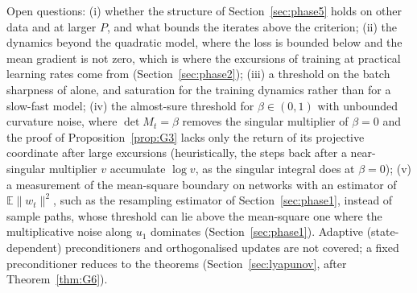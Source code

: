 \documentclass[11pt]{article}
\theoremstyle{remark}
\newcommand{\E}{\mathbb{E}}
\begin{document}
Open questions: (i) whether the structure of Section~\ref{sec:phase5} holds on other data and at larger $P$, and what bounds the iterates above the criterion; (ii) the dynamics beyond the quadratic model, where the loss is bounded below and the mean gradient is not zero, which is where the excursions of training at practical learning rates come from (Section~\ref{sec:phase2}); (iii) a threshold on the batch sharpness of \citet[Definition~3.1]{andreyev2026momentum} alone, and saturation for the training dynamics rather than for a slow-fast model; (iv) the almost-sure threshold for $\beta\in(0,1)$ with unbounded curvature noise, where $\det M_t=\beta$ removes the singular multiplier of $\beta=0$ and the proof of Proposition~\ref{prop:G3} lacks only the return of its projective coordinate after large excursions (heuristically, the steps back after a near-singular multiplier $v$ accumulate $\log v$, as the singular integral does at $\beta=0$); (v) a measurement of the mean-square boundary on networks with an estimator of $\E\|w_t\|^2$, such as the resampling estimator of Section~\ref{sec:phase1}, instead of sample paths, whose threshold can lie above the mean-square one where the multiplicative noise along $u_1$ dominates (Section~\ref{sec:phase1}). Adaptive (state-dependent) preconditioners and orthogonalised updates are not covered; a fixed preconditioner reduces to the theorems (Section~\ref{sec:lyapunov}, after Theorem~\ref{thm:G6}).
\end{document}
